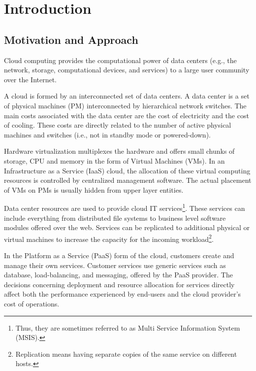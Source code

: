 \chapter{Introduction}  
 \section{Motivation and Approach}   
 Cloud computing provides the computational power of data centers (e.g., the network, storage, computational devices, and services) to a large user community over the Internet. 

	 A cloud is formed by an interconnected set of data centers. 
  A data center is a set of physical machines (PM) interconnected by hierarchical network switches.
 The main costs associated with the data center are the cost of electricity and the cost of cooling.   
  These costs are directly related to the number of active physical machines and switches (i.e., not in standby mode or powered-down). %
 
 Hardware virtualization multiplexes the hardware and offers small chunks of storage, CPU and memory in the form of Virtual Machines (VMs). In an Infrastructure as a Service (IaaS) cloud, the allocation of these virtual computing resources is controlled by centralized management software. The actual placement of VMs on PMs is usually hidden from upper layer entities. 
 
   Data center resources are used to provide cloud IT services\footnote{Thus, they are sometimes referred to as Multi Service Information System (MSIS)\cite{li2011fast}.}. These services can include everything from distributed file systems to business level software modules offered over the web. 
Services can be replicated to additional physical or virtual machines to increase the capacity for the incoming workload\footnote{Replication means having separate copies of the same service on different hosts.}. 

 In the Platform as a Service (PaaS) form of the cloud, customers create and manage their own services.
 Customer services use generic services such as database, load-balancing, and messaging, offered by the PaaS provider. The decisions concerning deployment and resource allocation for services directly affect both the performance experienced by end-users and the cloud provider's cost of operations.

